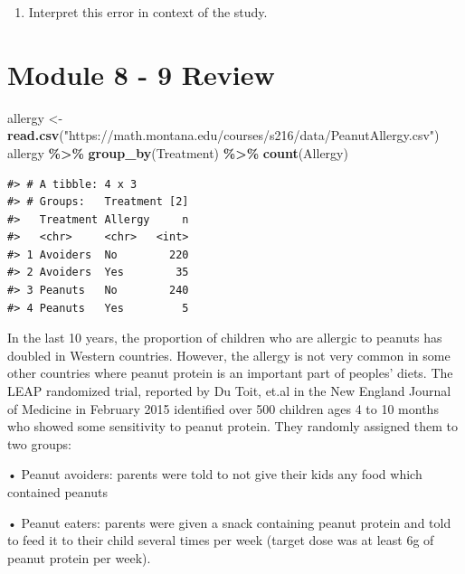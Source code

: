 \documentclass[
]{report}
\newenvironment{Shaded}{\begin{snugshade}}{\end{snugshade}}
\newcommand{\FunctionTok}[1]{\textcolor[rgb]{0.13,0.29,0.53}{\textbf{#1}}}
\newcommand{\NormalTok}[1]{#1}
\newcommand{\OtherTok}[1]{\textcolor[rgb]{0.56,0.35,0.01}{#1}}
\newcommand{\SpecialCharTok}[1]{\textcolor[rgb]{0.81,0.36,0.00}{\textbf{#1}}}
\newcommand{\StringTok}[1]{\textcolor[rgb]{0.31,0.60,0.02}{#1}}
\providecommand{\tightlist}{%
  \setlength{\itemsep}{0pt}\setlength{\parskip}{0pt}}
\begin{document}
\vspace{0.3in}

\begin{enumerate}
\def\labelenumi{\arabic{enumi}.}
\setcounter{enumi}{8}
\tightlist
\item
  Interpret this error in context of the study.
\end{enumerate}

\newpage

\section{Module 8 - 9 Review}\label{module-8---9-review}

\begin{Shaded}
\begin{Highlighting}[]
\NormalTok{allergy }\OtherTok{\textless{}{-}} \FunctionTok{read.csv}\NormalTok{(}\StringTok{"https://math.montana.edu/courses/s216/data/PeanutAllergy.csv"}\NormalTok{) }
\NormalTok{allergy }\SpecialCharTok{\%\textgreater{}\%} \FunctionTok{group\_by}\NormalTok{(Treatment) }\SpecialCharTok{\%\textgreater{}\%} \FunctionTok{count}\NormalTok{(Allergy)}
\end{Highlighting}
\end{Shaded}

\begin{verbatim}
#> # A tibble: 4 x 3
#> # Groups:   Treatment [2]
#>   Treatment Allergy     n
#>   <chr>     <chr>   <int>
#> 1 Avoiders  No        220
#> 2 Avoiders  Yes        35
#> 3 Peanuts   No        240
#> 4 Peanuts   Yes         5
\end{verbatim}

In the last 10 years, the proportion of children who are allergic to peanuts has doubled in Western countries. However, the allergy is not very common in some other countries where peanut protein is an important part of peoples' diets. The LEAP randomized trial, reported by Du Toit, et.al in the New England Journal of Medicine in February 2015 identified over 500 children ages 4 to 10 months who showed some sensitivity to peanut protein. They randomly assigned them to two groups:

• Peanut avoiders: parents were told to not give their kids any food which contained peanuts

• Peanut eaters: parents were given a snack containing peanut protein and told to feed it to their child several times per week (target dose was at least 6g of peanut protein per week).
\end{document}
